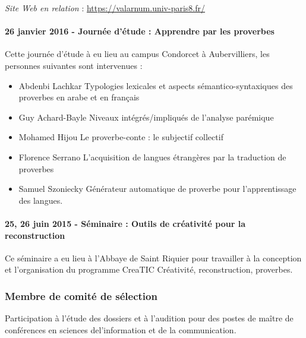 \documentclass[
  a4paper,
  DIV=11,
  numbers=noendperiod]{scrreprt}
\let\oldparagraph\paragraph
\renewcommand{\paragraph}[1]{\oldparagraph{#1}\mbox{}}
\begin{document}
\emph{Site Web en relation} : \url{https://valarnum.univ-paris8.fr/}

\paragraph{\texorpdfstring{26 janvier 2016 - \textbf{Journée d'étude} :
Apprendre par les
proverbes}{26 janvier 2016 - Journée d'étude : Apprendre par les proverbes}}\label{janvier-2016---journuxe9e-duxe9tude-apprendre-par-les-proverbes}

Cette journée d'étude à eu lieu au campus Condorcet à Aubervilliers, les
personnes suivantes sont intervenues :

\begin{itemize}
\item
  Abdenbi Lachkar Typologies lexicales et aspects sémantico-syntaxiques
  des proverbes en arabe et en français
\item
  Guy Achard-Bayle Niveaux intégrés/impliqués de l'analyse parémique
\item
  Mohamed Hijou Le proverbe-conte : le subjectif collectif
\item
  Florence Serrano L'acquisition de langues étrangères par la traduction
  de proverbes
\item
  Samuel Szoniecky Générateur automatique de proverbe pour
  l'apprentissage des langues.
\end{itemize}

\paragraph{\texorpdfstring{25, 26 juin 2015 - \textbf{Séminaire} :
Outils de créativité pour la
reconstruction}{25, 26 juin 2015 - Séminaire : Outils de créativité pour la reconstruction}}\label{juin-2015---suxe9minaire-outils-de-cruxe9ativituxe9-pour-la-reconstruction}

Ce séminaire a eu lieu à l'Abbaye de Saint Riquier pour travailler à la
conception et l'organisation du programme CreaTIC Créativité,
reconstruction, proverbes.

\subsubsection{Membre de comité de
sélection}\label{membre-de-comituxe9-de-suxe9lection}

Participation à l'étude des dossiers et à l'audition pour des postes de
maître de conférences en sciences del'information et de la
communication.
\end{document}
